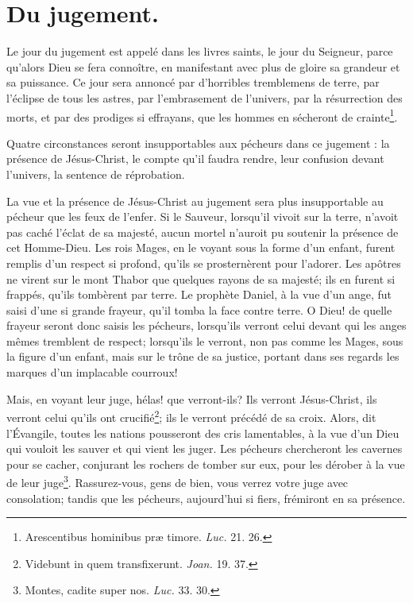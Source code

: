 \documentclass[instructions.tex]{subfiles}
\begin{document}
 
\chapter{Du jugement.}
 
Le jour du jugement est appelé dans les livres saints, le jour du Seigneur, parce qu'alors Dieu se fera connoître, en manifestant avec plus de gloire sa grandeur et sa puissance. Ce jour sera annoncé par d'horribles tremblemens de terre, par l'éclipse de tous les astres, par l'embrasement de l'univers, par la résurrection des morts, et par des prodiges si effrayans, que les hommes en sécheront de crainte\footnote{Arescentibus hominibus præ timore. \textit{Luc.} 21. 26.}.
 
Quatre circonstances seront insupportables aux pécheurs dans ce jugement : la présence de Jésus-Christ, le compte qu'il faudra rendre, leur confusion devant l'univers, la sentence de réprobation.
 
\primo La vue et la présence de Jésus-Christ au jugement sera plus insupportable au pécheur que les feux de l'enfer. Si le Sauveur, lorsqu'il vivoit sur la terre, n'avoit pas caché l'éclat de sa majesté, aucun mortel n'auroit pu soutenir la présence de cet Homme-Dieu. Les rois Mages, en le voyant sous la forme d'un enfant, furent remplis d'un respect si profond, qu'ils se prosternèrent pour l'adorer. Les apôtres ne virent sur le mont Thabor que quelques rayons de sa majesté; ils en furent si frappés, qu'ils tombèrent par terre. Le prophète Daniel, à la vue d'un ange, fut saisi d'une si grande frayeur, qu'il tomba la face contre terre. O Dieu! de quelle frayeur seront donc saisis les pécheurs, lorsqu'ils verront celui devant qui les anges mêmes tremblent de respect; lorsqu'ils le verront, non pas comme les Mages, sous la figure d'un enfant, mais sur le trône de sa justice, portant dans ses regards les marques d'un implacable courroux!
 
Mais, en voyant leur juge, hélas! que verront-ils? Ils verront Jésus-Christ, ils verront celui qu'ils ont crucifié\footnote{Videbunt in quem transfixerunt. \textit{Joan.} 19. 37.}; ils le verront précédé de sa croix. Alors, dit l'Évangile, toutes les nations pousseront des cris lamentables, à la vue d'un Dieu qui vouloit les sauver et qui vient les juger. Les pécheurs chercheront les cavernes pour se cacher, conjurant les rochers de tomber sur eux, pour les dérober à la vue de leur juge\footnote{Montes, cadite super nos. \textit{Luc.} 33. 30.}. Rassurez-vous, gens de bien, vous verrez votre juge avec consolation; tandis que les pécheurs, aujourd'hui si fiers, frémiront en sa présence.
 
\end{document}
